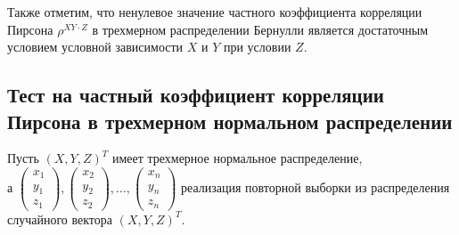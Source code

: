 Также отметим, что ненулевое значение частного
коэффициента корреляции Пирсона $\rho^{XY\cdot Z}$
в трехмерном распределении Бернулли является достаточным
условием условной зависимости $X$ и $Y$ при условии $Z$.

\subsection{Тест на частный коэффициент корреляции Пирсона
в трехмерном
нормальном распределении}\label{partial_test}
Пусть $(X,Y,Z)^T$ имеет трехмерное нормальное распределение, \\ а
    $
        \begin{pmatrix}
            x_1 \\
            y_1 \\
            z_1
        \end{pmatrix},
        \begin{pmatrix}
            x_2 \\
            y_2 \\
            z_2
        \end{pmatrix}, \ldots,
        \begin{pmatrix}
            x_n \\
            y_n \\
            z_n
        \end{pmatrix}
    $
реализация повторной выборки из распределения случайного вектора $(X,Y,Z)^T$.

